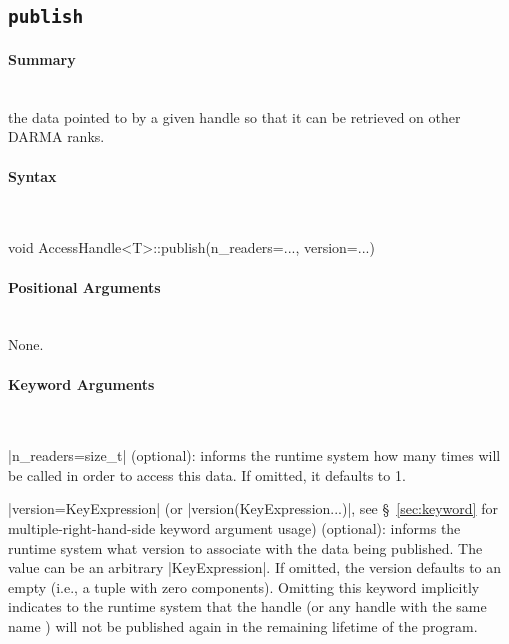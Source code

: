\subsection{\texttt{publish}}
\label{ssec:api_fe_publish}

\paragraph{Summary} \mbox{}\\
 the data pointed to by a given \gls{handle} so that it can be retrieved on 
other \gls{DARMA} \glspl{rank}.

\paragraph{Syntax} \mbox{}\\
\begin{CppCode}
void
AccessHandle<T>::publish(n_readers=..., version=...)
\end{CppCode}

\paragraph{Positional Arguments} \mbox{}\\
None.

\paragraph{Keyword Arguments} \mbox{}\\
\begin{compactitem}
\item |n_readers=size_t| (optional): informs the \gls{runtime system} how many times
 will be called in order to access this data.
If omitted, it defaults to 1.
\item |version=KeyExpression| (or |version(KeyExpression...)|,
  see \S~\ref{sec:keyword} for multiple-right-hand-side \gls{keyword argument} usage)
(optional):
informs the \gls{runtime system} what version to associate with the data being published. 
The value can be an arbitrary |KeyExpression|.
If omitted, the version defaults to an empty  (i.e., a
 \gls{tuple} with zero 
components).  Omitting this keyword implicitly indicates to the \gls{runtime
system} that the \gls{handle} (or any \gls{handle} with the same name
) will not be published
again in the remaining lifetime of the program.
\end{compactitem}

